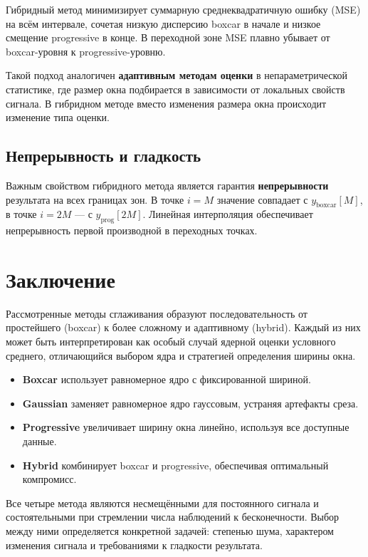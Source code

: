 \documentclass[12pt,a4paper]{article}
\begin{document}
Гибридный метод минимизирует суммарную среднеквадратичную ошибку (MSE) на всём интервале, сочетая низкую дисперсию boxcar в начале и низкое смещение progressive в конце. В переходной зоне MSE плавно убывает от boxcar-уровня к progressive-уровню.

Такой подход аналогичен \textbf{адаптивным методам оценки} в непараметрической статистике, где размер окна подбирается в зависимости от локальных свойств сигнала. В гибридном методе вместо изменения размера окна происходит изменение типа оценки.

\subsection{Непрерывность и гладкость}

Важным свойством гибридного метода является гарантия \textbf{непрерывности} результата на всех границах зон. В точке $i = M$ значение совпадает с $y_{\text{boxcar}}[M]$, в точке $i = 2M$ --- с $y_{\text{prog}}[2M]$. Линейная интерполяция обеспечивает непрерывность первой производной в переходных точках.

\section{Заключение}

Рассмотренные методы сглаживания образуют последовательность от простейшего (boxcar) к более сложному и адаптивному (hybrid). Каждый из них может быть интерпретирован как особый случай ядерной оценки условного среднего, отличающийся выбором ядра и стратегией определения ширины окна.

\begin{itemize}
  \item \textbf{Boxcar} использует равномерное ядро с фиксированной шириной.
  \item \textbf{Gaussian} заменяет равномерное ядро гауссовым, устраняя артефакты среза.
  \item \textbf{Progressive} увеличивает ширину окна линейно, используя все доступные данные.
  \item \textbf{Hybrid} комбинирует boxcar и progressive, обеспечивая оптимальный компромисс.
\end{itemize}

Все четыре метода являются несмещёнными для постоянного сигнала и состоятельными при стремлении числа наблюдений к бесконечности. Выбор между ними определяется конкретной задачей: степенью шума, характером изменения сигнала и требованиями к гладкости результата.
\end{document}
